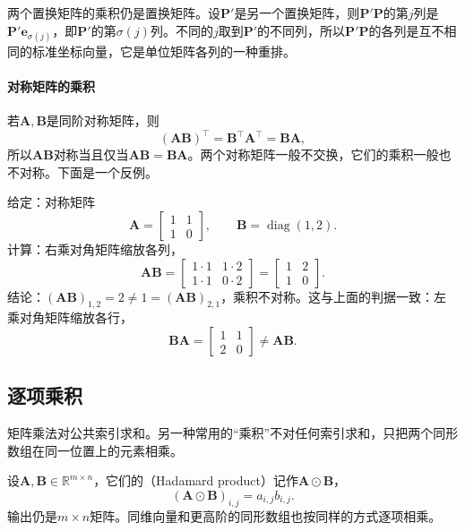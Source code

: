 两个置换矩阵的乘积仍是置换矩阵。设$\bm P'$是另一个置换矩阵，则$\bm P'\bm P$的第$j$列是$\bm P'\bm e_{\sigma(j)}$，即$\bm P'$的第$\sigma(j)$列。不同的$j$取到$\bm P'$的不同列，所以$\bm P'\bm P$的各列是互不相同的标准坐标向量，它是单位矩阵各列的一种重排。

\paragraph{对称矩阵的乘积}
若$\bm A,\bm B$是同阶对称矩阵，则
\[
 (\bm A\bm B)^\top=\bm B^\top\bm A^\top=\bm B\bm A,
\]
所以$\bm A\bm B$对称当且仅当$\bm A\bm B=\bm B\bm A$。两个对称矩阵一般不交换，它们的乘积一般也不对称。下面是一个反例。
\begin{example}[反例：两个对称矩阵的乘积不对称]
\label{ex:ls-symmetric-product-not-symmetric}
给定：对称矩阵
\[
\bm A=\begin{bmatrix}1&1\\1&0\end{bmatrix},\qquad
\bm B=\operatorname{diag}(1,2).
\]
计算：右乘对角矩阵缩放各列，
\[
 \bm A\bm B=\begin{bmatrix}1\cdot1&1\cdot2\\1\cdot1&0\cdot2\end{bmatrix}=\begin{bmatrix}1&2\\1&0\end{bmatrix}.
\]
结论：$(\bm A\bm B)_{1,2}=2\neq1=(\bm A\bm B)_{2,1}$，乘积不对称。这与上面的判据一致：左乘对角矩阵缩放各行，
\[
 \bm B\bm A=\begin{bmatrix}1&1\\2&0\end{bmatrix}\neq\bm A\bm B.
\]
\end{example}

\subsection{逐项乘积}
\label{sec:ls-hadamard-product}

矩阵乘法对公共索引求和。另一种常用的“乘积”不对任何索引求和，只把两个同形数组在同一位置上的元素相乘。

设$\bm A,\bm B\in\mathbb R^{m\times n}$，它们的（Hadamard product）记作$\bm A\odot\bm B$，
\begin{equation}
 (\bm A\odot\bm B)_{i,j}=a_{i,j}b_{i,j}.
 \label{eq:ls-hadamard}
\end{equation}
输出仍是$m\times n$矩阵。同维向量和更高阶的同形数组也按同样的方式逐项相乘。

